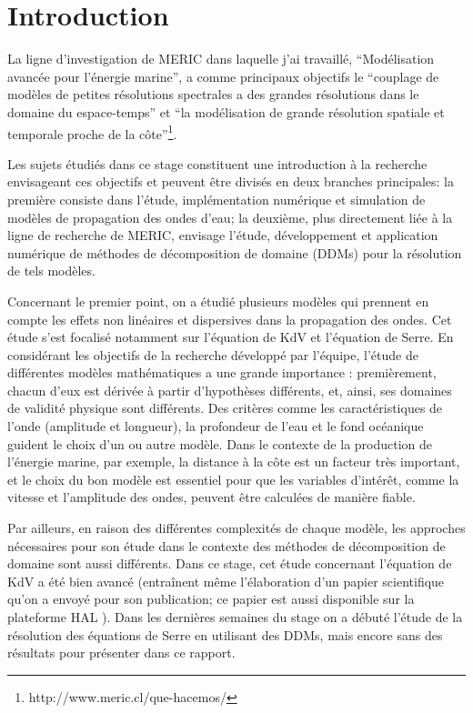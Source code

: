 \section{Introduction}

\indent La ligne d'investigation de MERIC dans laquelle j'ai travaillé, ``Modélisation avancée pour l'énergie marine'', a comme principaux objectifs le ``couplage de modèles de petites résolutions spectrales a des grandes résolutions dans le domaine du espace-temps'' et ``la modélisation de grande résolution spatiale et temporale proche de la côte''\footnote{http://www.meric.cl/que-hacemos/}.

\indent Les sujets étudiés dans ce stage constituent une introduction à la recherche envisageant ces objectifs et peuvent être divisés en deux branches principales: la première consiste dans l'étude, implémentation numérique et simulation de modèles de propagation des ondes d'eau; la deuxième, plus directement liée à la ligne de recherche de MERIC, envisage l'étude, développement et application numérique de méthodes de décomposition de domaine (DDMs) pour la résolution de tels modèles.

\indent Concernant le premier point, on a étudié plusieurs modèles qui prennent en compte les effets non linéaires et dispersives dans la propagation des ondes. Cet étude s'est focalisé notamment sur l'équation de KdV et l'équation de Serre. En considérant les objectifs de la recherche développé par l'équipe, l'étude de différentes modèles mathématiques a une grande importance : premièrement, chacun d'eux est dérivée à partir d'hypothèses différents, et, ainsi, ses domaines de validité physique sont différents. Des critères comme les caractéristiques de l'onde (amplitude et longueur), la profondeur de l'eau et le fond océanique guident le choix d'un ou autre modèle. Dans le contexte de la production de l'énergie marine, par exemple, la distance à la côte est un facteur très important, et le choix du bon modèle est essentiel pour que les variables d'intérêt, comme la vitesse et l'amplitude des ondes, peuvent être calculées de manière fiable.

\indent Par ailleurs, en raison des différentes complexités de chaque modèle, les approches nécessaires pour son étude dans le contexte des méthodes de décomposition de domaine sont aussi différents. Dans ce stage, cet étude concernant l'équation de KdV a été bien avancé (entraînent même l'élaboration d'un papier scientifique qu'on a envoyé pour son publication; ce papier est aussi disponible sur la plateforme HAL \cite{joao2016}). Dans les dernières semaines du stage on a débuté l'étude de la résolution des équations de Serre en utilisant des DDMs, mais encore sans des résultats pour présenter dans ce rapport.

